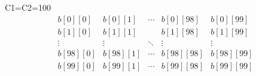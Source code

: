 \documentclass{jarticle}
\begin{document}
{\sf C1}={\sf C2}=100
 \[
 \begin{array}{cccccc}
  b[0][0] & b[0][1] & \cdots & b[0][98] & b[0][99]\\
  b[1][0] & b[1][1] &        & b[1][98] & b[1][99]\\
   \vdots & \vdots  & \ddots   &    \vdots           &  \vdots\\
  b[98][0] & b[98][1] &\cdots  & b[98][98] & b[98][99]\\
  b[99][0] & b[99][1] &\cdots  & b[99][98] & b[99][99]\\
 \end{array}
 \]
\end{document}

